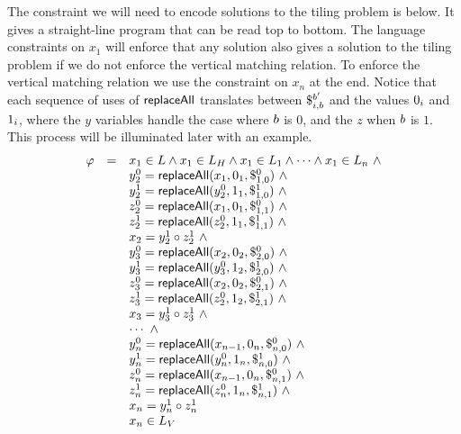 \documentclass{article}
\newcommand{\concat} {\circ}
\begin{document}
The constraint we will need to encode solutions to the tiling problem is below.
It gives a straight-line program that can be read top to bottom.
The language constraints on $x_1$ will enforce that any solution also gives a solution to the tiling problem if we do not enforce the vertical matching relation.
To enforce the vertical matching relation we use the constraint on $x_n$ at the end.
Notice that each sequence of uses of $\replaceall$ translates between
$\repl{i}{\bit}{\bit'}$
and the values $\nbit{i}{0}$ and $\nbit{i}{1}$, where the $y$ variables handle the case where $\bit$ is $0$, and the $z$ when $\bit$ is $1$.
This process will be illuminated later with an example.
\[
    \begin{array}{rcl}
        \varphi &=& x_1 \in L \land
                    x_1 \in L_\hcons \land
                    x_1 \in L_1 \land
                    \cdots \land
                    x_1 \in L_n\ \land \\
                & & y^0_2 = \replaceall(x_1, \nbit{1}{0}, \repl{1}{0}{0}) \ \land \\
                & & y^1_2 = \replaceall(y^0_2, \nbit{1}{1}, \repl{1}{0}{1}) \ \land \\
                & & z^0_2 = \replaceall(x_1, \nbit{1}{0}, \repl{1}{1}{0}) \ \land \\
                & & z^1_2 = \replaceall(z^0_2, \nbit{1}{1}, \repl{1}{1}{1}) \ \land \\
                & & x_2 = y^1_2 \concat z^1_2 \ \land \\
                & & y^0_3 = \replaceall(x_2, \nbit{2}{0}, \repl{2}{0}{0}) \ \land \\
                & & y^1_3 = \replaceall(y^0_3, \nbit{2}{1}, \repl{2}{0}{1}) \ \land \\
                & & z^0_3 = \replaceall(x_2, \nbit{2}{0}, \repl{2}{1}{0}) \ \land \\
                & & z^1_3 = \replaceall(z^0_2, \nbit{2}{1}, \repl{2}{1}{1}) \ \land \\
                & & x_3 = y^1_3 \concat z^1_3 \ \land \\
                & & \cdots \ \land \\
                & & y^0_n = \replaceall(x_{n-1}, \nbit{n}{0}, \repl{n}{0}{0}) \ \land \\
                & & y^1_n = \replaceall(y^0_n, \nbit{n}{1}, \repl{n}{0}{1}) \ \land \\
                & & z^0_n = \replaceall(x_{n-1}, \nbit{n}{0}, \repl{n}{1}{0}) \ \land \\
                & & z^1_n = \replaceall(z^0_n, \nbit{n}{1}, \repl{n}{1}{1}) \ \land \\
                & & x_n = y^1_n \concat z^1_n \\

                & & x_n \in L_\vcons
    \end{array}
\]
\end{document}
